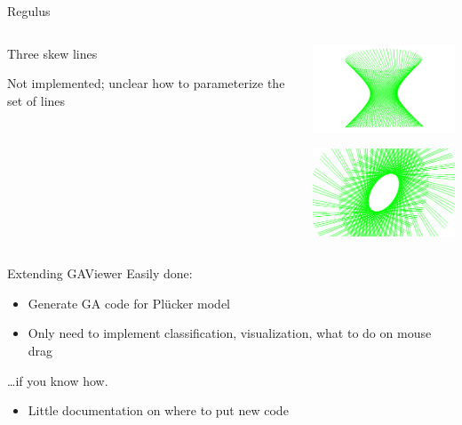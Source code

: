 \documentclass{beamer}
\begin{document}
\begin{frame}{Regulus}
  \begin{columns}
    \begin{column}{5cm}
      Three skew lines

      \bigskip

      Not implemented; unclear how to parameterize the set of lines
    \end{column}
    \begin{column}{5cm}
      \begin{center}
        \includegraphics[width=5cm]{regulus1}

        \includegraphics[width=5cm]{regulus2}
      \end{center}
    \end{column}
  \end{columns}
\end{frame}

\begin{frame}{Extending GAViewer}
  Easily done:
  \begin{itemize}
    \item Generate GA code for Pl\"ucker model
    \item Only need to implement classification, visualization, what to do on mouse drag
  \end{itemize}
  
  \ldots if you know how.
  \begin{itemize}
    \item Little documentation on where to put new code
  \end{itemize}
\end{frame}
\end{document}
